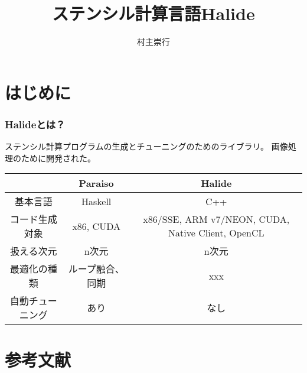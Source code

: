 \documentclass[dvipdfmx,cjk]{beamer}   %
\theoremstyle{example}
\begin{document}
\title[Halide]{ステンシル計算言語Halide}
\author[T. Muranushi]{村主崇行}            %

\begin{frame}                  %
\titlepage                     %
\end{frame}

\begin{frame}                  %
\tableofcontents
\end{frame}

\section{はじめに} 
\begin{frame}\frametitle{Halideとは？}
ステンシル計算プログラムの生成とチューニングのためのライブラリ。
画像処理のために開発された。
\begin{center}
  \begin{tabular}{|c|c|c|}
    \hline
    &Paraiso & Halide\\
    \hline
    基本言語 & Haskell & C++ \\
    コード生成対象 & x86, CUDA &
    \multicolumn{1}{p{5cm}|}{x86/SSE, ARM v7/NEON, CUDA, Native Client, OpenCL }\\
    扱える次元 & n次元 & n次元 \\ 
    最適化の種類 & ループ融合、同期 & xxx \\ 
    自動チューニング & あり & なし \\ 
    \hline
  \end{tabular}
\end{center}
\end{frame}







\section{参考文献}
\begin{frame}[fragile]\frametitle{}
  \begin{minipage}[t]{0.9\textwidth}
  \end{minipage}
\end{frame}
\end{document}
